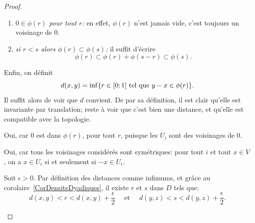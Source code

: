 \begin{proof}
\begin{enumerate}
    Sinon, posons \(k \) le plus petit entier tel que \( t_k \neq r_k + s_k\). Alors, nécessairement, \( r_k = 0,\ s_k = 0\) et \( t_k = 1\). Il s'ensuit, grâce à \eqref{EqBaseTopoMetriquePf1} et \eqref{EqBaseTopoMetriquePf2}, que
    \begin{gather}
      \phi(r) = \sum_{i=1}^{k-1} r_i V_i + \sum_{i=k+1}^n r_i V_i \subset \sum_{i=1}^{k-1} r_i V_i + V_{k+1}+ V_{k+1};\\
      \phi(s) = \sum_{i=1}^{k-1} s_i V_i + \sum_{i=k+1}^n s_i V_i \subset \sum_{i=1}^{k-1} s_i V_i + V_{k+1}+ V_{k+1};\text{ d'où}\\
      \phi(r)+\phi(s) = \sum_{i=1}^{k-1} r_i V_i + \sum_{i=1}^{k-1} s_i V_i + V_{k+1}+ V_{k+1} + V_{k+1}+ V_{k+1} = \sum_{i=1}^{k-1} t_i V_i + V_k \subset \phi(r+s).
    \end{gather}
  \item \emph{\(0  \in \phi(r)\) pour tout \(r\):} en effet, \(\phi(r)\) n'est jamais vide, c'est toujours un voisinage de \(0\).
  \item \label{PhiEstTotalementOrdonne} \emph{si \(r < s \) alors \( \phi(r) \subset \phi(s) \):} il suffit d'écrire
    \begin{equation}
      \phi(r) \subset \phi(r) + \phi(s-r) \subset \phi(s).
    \end{equation}
\end{enumerate}
Enfin, on définit
\begin{equation}\label{EqDefDistanceCompatible}
d(x,y) = \inf\{r \in \mathopen[0;1\mathclose] \text{ tel que } y - x \in \phi(r)\}.
\end{equation}
Il suffit alors de voir que \(d\) convient. De par sa définition, il est clair qu'elle est invariante par translation; reste à voir que c'est bien une distance, et qu'elle est compatible avec la topologie.
\begin{subproof}
\item [$d(x,x) = 0$] Oui, car \(0\) est dans \(\phi(r)\), pour tout \(r \), puisque les \( U_i \) sont des voisinages de \(0\).
\item[$d(x,y) = d(y,x)$] Oui, car tous les voisinages considérés sont symétriques: pour tout \(i\) et tout \(x \in V\), on a \(x \in U_i\) si et seulement si  \(-x \in U_i\).
\item[$d(x,z) \leq d(x,y) + d(y,z)$] Soit \(\epsilon > 0 \). Par définition des distances comme infimums, et grâce au corolaire~\ref{CorDensiteDyadiques}, il existe \(r\) et \(s\) dans \( D \) tels que:
  \begin{equation}
    d(x,y) < r < d(x,y) + \frac \epsilon 2 \quad\text{ et }\quad d(y,z) < s < d(y,z) + \frac \epsilon 2 .

\end{equation}
\end{subproof}
\end{proof}
